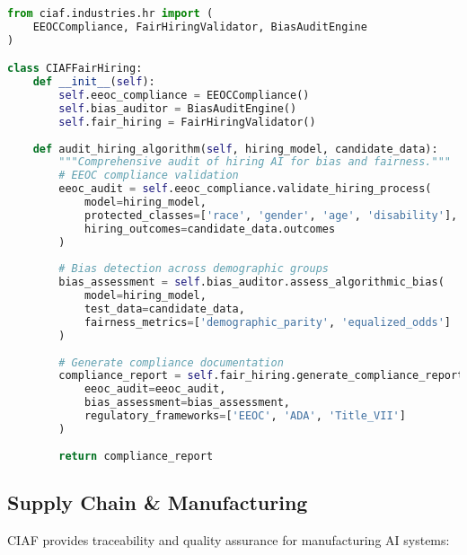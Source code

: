 \documentclass[12pt,a4paper]{article}
\begin{document}
\begin{lstlisting}[language=Python, caption=Fair Hiring AI Implementation]
from ciaf.industries.hr import (
    EEOCCompliance, FairHiringValidator, BiasAuditEngine
)

class CIAFFairHiring:
    def __init__(self):
        self.eeoc_compliance = EEOCCompliance()
        self.bias_auditor = BiasAuditEngine()
        self.fair_hiring = FairHiringValidator()
    
    def audit_hiring_algorithm(self, hiring_model, candidate_data):
        """Comprehensive audit of hiring AI for bias and fairness."""
        # EEOC compliance validation
        eeoc_audit = self.eeoc_compliance.validate_hiring_process(
            model=hiring_model,
            protected_classes=['race', 'gender', 'age', 'disability'],
            hiring_outcomes=candidate_data.outcomes
        )
        
        # Bias detection across demographic groups
        bias_assessment = self.bias_auditor.assess_algorithmic_bias(
            model=hiring_model,
            test_data=candidate_data,
            fairness_metrics=['demographic_parity', 'equalized_odds']
        )
        
        # Generate compliance documentation
        compliance_report = self.fair_hiring.generate_compliance_report(
            eeoc_audit=eeoc_audit,
            bias_assessment=bias_assessment,
            regulatory_frameworks=['EEOC', 'ADA', 'Title_VII']
        )
        
        return compliance_report
\end{lstlisting}

\subsection{Supply Chain \& Manufacturing}

CIAF provides traceability and quality assurance for manufacturing AI systems:
\end{document}
